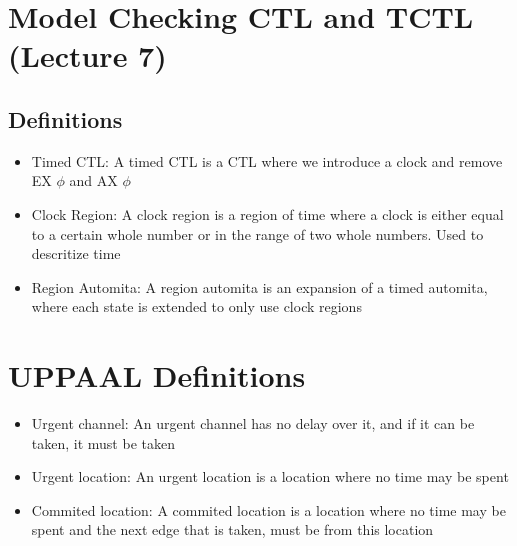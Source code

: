 \documentclass{article}
\begin{document}
	\section{Model Checking CTL and TCTL (Lecture 7)}
		\subsection{Definitions}
			\begin{itemize}
				\item Timed CTL: A timed CTL is a CTL where we introduce a clock and remove EX $\phi$ and AX $\phi$
				\item Clock Region: A clock region is a region of time where a clock is either equal to a certain whole number or in the range of two whole numbers. Used to descritize time
				\item Region Automita: A region automita is an expansion of a timed automita, where each state is extended to only use clock regions
			\end{itemize}

	\section{UPPAAL Definitions}
		\begin{itemize}
			\item Urgent channel: An urgent channel has no delay over it, and if it can be taken, it must be taken
			\item Urgent location: An urgent location is a location where no time may be spent
			\item Commited location: A commited location is a location where no time may be spent and the next edge that is taken, must be from this location
		\end{itemize}
	
\end{document}
